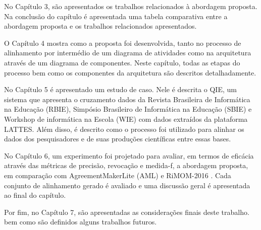 No Capítulo 3, são apresentados os trabalhos relacionados à abordagem proposta. Na conclusão do capítulo é apresentada uma tabela comparativa entre a abordagem proposta e os trabalhos relacionados apresentados.

O Capítulo 4 mostra como a proposta foi desenvolvida, tanto no processo de alinhamento por intermédio de um diagrama de atividades como na arquitetura através de um diagrama de componentes. Neste capítulo, todas as etapas do processo bem como os componentes da arquitetura são descritos detalhadamente.

No Capítulo 5 é apresentado um estudo de caso. Nele é descrita o QIE, um sistema que apresenta o cruzamento dados da Revista Brasileira de Informática na Educação (RBIE), Simpósio Brasileiro de Informática na Educação (SBIE) e Workshop de informática na Escola (WIE) com dados extraídos da plataforma LATTES. Além disso, é descrito como o processo foi utilizado para alinhar os dados dos pesquisadores e de suas produções científicas entre essas bases.

No Capítulo 6, um experimento foi projetado para avaliar, em termos de eficácia através das métricas de precisão, revocação e medida-f, a abordagem proposta, em comparação com AgreementMakerLite (AML) \cite{fariaoaei} e RiMOM-2016 \cite{zhang2016rimom}. Cada conjunto de alinhamento gerado é avaliado e uma discussão geral é apresentada ao final do capítulo.

Por fim, no Capítulo 7, são apresentadas as considerações finais deste trabalho. bem como são definidos alguns trabalhos futuros.
